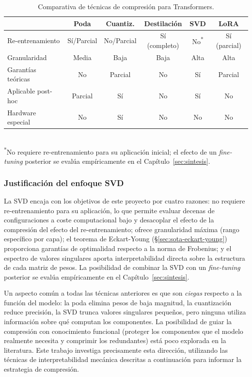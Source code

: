 \begin{table}[H]
    \centering
    \caption{Comparativa de técnicas de compresión para Transformers.}
    \label{tab:comparativa-tecnicas}
    \small
    \begin{tabular}{@{}l c c c c c@{}}
        \toprule
        & \textbf{Poda} & \textbf{Cuantiz.} & \textbf{Destilación} & \textbf{SVD} & \textbf{LoRA} \\
        \midrule
        Re-entrenamiento      & Sí/Parcial & No/Parcial & Sí (completo) & No\textsuperscript{*}   & Sí (parcial) \\
        Granularidad          & Media       & Baja       & Baja          & Alta & Alta \\
        Garantías teóricas    & No          & Parcial    & No            & Sí   & Parcial \\
        Aplicable post-hoc    & Parcial     & Sí         & No            & Sí   & No \\
        Hardware especial     & No          & Sí         & No            & No   & No \\
        \bottomrule
    \end{tabular}
    \\[0.15cm]{\scriptsize \textsuperscript{*}No requiere re-entrenamiento para
    su aplicación inicial; el efecto de un \emph{fine-tuning} posterior se evalúa
    empíricamente en el Capítulo~\ref{sec:sintesis}.}
\end{table}

\subsubsection{Justificación del enfoque SVD}

La SVD encaja con los objetivos de este proyecto por cuatro razones: no requiere
re-entrenamiento para su aplicación, lo que permite evaluar decenas de
configuraciones a coste computacional bajo y desacoplar el efecto de la
compresión del efecto del re-entrenamiento; ofrece granularidad máxima
(rango específico por capa); el teorema de Eckart-Young
(\S\ref{sec:sota-eckart-young}) proporciona garantías de optimalidad respecto a
la norma de Frobenius; y el espectro de valores singulares aporta
interpretabilidad directa sobre la estructura de cada matriz de pesos. La
posibilidad de combinar la SVD con un \emph{fine-tuning} posterior se evalúa
empíricamente en el Capítulo~\ref{sec:sintesis}.

Un aspecto común a todas las técnicas anteriores es que son \emph{ciegas} respecto
a la función del modelo: la poda elimina pesos de baja magnitud, la cuantización
reduce precisión, la SVD trunca valores singulares pequeños, pero ninguna utiliza
información sobre qué computan los componentes. La posibilidad de guiar la
compresión con conocimiento funcional (proteger los componentes que el modelo
realmente necesita y comprimir los redundantes) está poco explorada en la
literatura. Este trabajo investiga precisamente esta dirección, utilizando las
técnicas de interpretabilidad mecánica descritas a continuación para informar la
estrategia de compresión.


